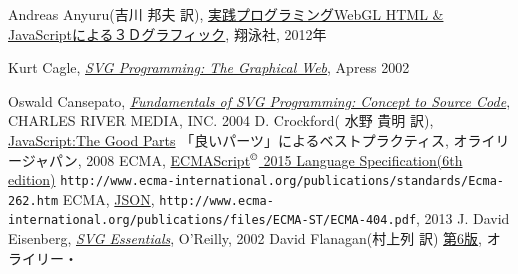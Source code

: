 \begin{thebibliography}{99}
Andreas Anyuru(吉川 邦夫 訳),
\href{http://www.amazon.co.jp/%E5%AE%9F%E8%B7%B5%E3%83%97%E3%83%AD%E3%82%B0%E3%83%A9%E3%83%9F%E3%83%B3%E3%82%B0WebGL-HTML-JavaScript%E3%81%AB%E3%82%88%E3%82%8B3D%E3%82%B0%E3%83%A9%E3%83%95%E3%82%A3%E3%83%83%E3%82%AF%E3%82%B9%E9%96%8B%E7%99%BA-Programmer%E2%80%99s-SELECTION/dp/4798129534/ref=sr_1_1?ie=UTF8&qid=1365330500&sr=8-1&keywords=%E5%AE%9F%E8%B7%B5%E3%83%97%E3%83%AD%E3%82%B0%E3%83%A9%E3%83%9F%E3%83%B3%E3%82%B0WebGL}
{実践プログラミングWebGL HTML \& JavaScriptによる３Ｄグラフィック},
翔泳社, 2012年
\iffalse\else
{} Kurt Cagle, 
   \href{http://www.amazon.co.jp/exec/obidos/ASIN/1590590198/qid=1144561984/sr=1-4/ref=sr_1_10_4/249-1775097-0214759}
     {\it SVG Programming: The Graphical Web}, Apress 2002
\fi
  Oswald Cansepato, 
	\href{http://www.amazon.co.jp/exec/obidos/ASIN/1584502983/qid=1144561984/sr=1-1/ref=sr_1_10_1/249-1775097-0214759}
     {\it Fundamentals of SVG Programming: Concept to
	Source Code}, 
     CHARLES RIVER MEDIA, INC. 2004
 D. Crockford( 水野 貴明 訳),
	 \href{http://www.amazon.co.jp/JavaScript%253a-Parts-%E2%80%95%E3%80%8C%E8%89%AF%E3%81%84%E3%83%91%E3%83%BC%E3%83%84%E3%80%8D%E3%81%AB%E3%82%88%E3%82%8B%E3%83%99%E3%82%B9%E3%83%88%E3%83%97%E3%83%A9%E3%82%AF%E3%83%86%E3%82%A3%E3%82%B9-Douglas-Crockford/dp/4873113911/ref=sr_1_1?ie=UTF8&qid=1304649181&sr=8-1}{JavaScript:The Good Parts}
         「良いパーツ」によるベストプラクティス, オライリージャパン, 2008
 ECMA, 
\href{http://www.ecma-international.org/publications/standards/Ecma-262.htm}
{ECMAScript$^\copyright$ 2015 Language Specification(6th edition)}\newline
\texttt{http://www.ecma-international.org/publications/standards/Ecma-262.htm}
ECMA,
\href{http://www.ecma-international.org/publications/files/ECMA-ST/ECMA-404.pdf}
				{JSON},
\texttt{http://www.ecma-international.org/publications/files/ECMA-ST/ECMA-404.pdf}, 2013
 J. David Eisenberg,
\href{http://www.amazon.co.jp/gp/product/0596002238/250-4160686-1026605?v=glance&n=1000}{\it
	 SVG Essentials}, O'Reilly, 2002
 David Flanagan(村上列 訳) 
\href{http://www.amazon.co.jp/JavaScript-第6版-David-Flanagan/dp/4873115736/ref=sr_1_1?ie=UTF8&qid=1353802698&sr=8-1}{\JS{} 第6版}, オライリー・

\end{thebibliography}
